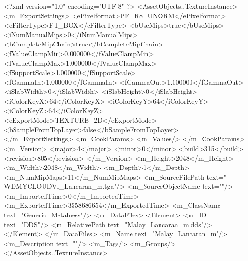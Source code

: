 <?xml version="1.0" encoding="UTF-8" ?>
<AssetObjects..TextureInstance>
	<m_ExportSettings>
		<ePixelformat>PF_R8_UNORM</ePixelformat>
		<eFilterType>FT_BOX</eFilterType>
		<bUseMips>true</bUseMips>
		<iNumManualMips>0</iNumManualMips>
		<bCompleteMipChain>true</bCompleteMipChain>
		<fValueClampMin>0.000000</fValueClampMin>
		<fValueClampMax>1.000000</fValueClampMax>
		<fSupportScale>1.000000</fSupportScale>
		<fGammaIn>1.000000</fGammaIn>
		<fGammaOut>1.000000</fGammaOut>
		<iSlabWidth>0</iSlabWidth>
		<iSlabHeight>0</iSlabHeight>
		<iColorKeyX>64</iColorKeyX>
		<iColorKeyY>64</iColorKeyY>
		<iColorKeyZ>64</iColorKeyZ>
		<eExportMode>TEXTURE_2D</eExportMode>
		<bSampleFromTopLayer>false</bSampleFromTopLayer>
	</m_ExportSettings>
	<m_CookParams>
		<m_Values/>
	</m_CookParams>
	<m_Version>
		<major>4</major>
		<minor>0</minor>
		<build>315</build>
		<revision>805</revision>
	</m_Version>
	<m_Height>2048</m_Height>
	<m_Width>2048</m_Width>
	<m_Depth>1</m_Depth>
	<m_NumMipMaps>11</m_NumMipMaps>
	<m_SourceFilePath text="\\WDMYCLOUD\Sam\Projects\Modding\Civ VI\Civilizations\Malaysia\Assets\Lancaran\Textures\Malay_Lancaran_m.tga"/>
	<m_SourceObjectName text=""/>
	<m_ImportedTime>0</m_ImportedTime>
	<m_ExportedTime>3558686654</m_ExportedTime>
	<m_ClassName text="Generic_Metalness"/>
	<m_DataFiles>
		<Element>
			<m_ID text="DDS"/>
			<m_RelativePath text="Malay_Lancaran_m.dds"/>
		</Element>
	</m_DataFiles>
	<m_Name text="Malay_Lancaran_m"/>
	<m_Description text=""/>
	<m_Tags/>
	<m_Groups/>
</AssetObjects..TextureInstance>

